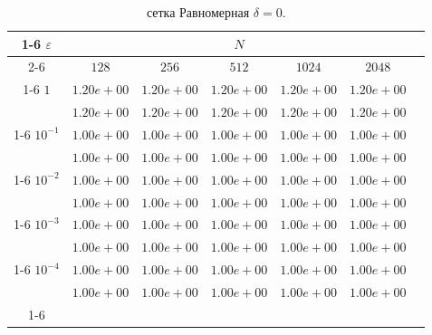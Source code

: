 \documentclass[10pt,twoside]{uz_kgu}
\begin{document}
\begin{table} [!htb]
    \caption {сетка Равномерная $\delta = 0.$}
        \begin{center}
\begin{tabular}{|c|c|c|c|c|c|c}
\cline{1-6} $\varepsilon$ & \multicolumn{5}{c|}{$N$} \\
\cline{2-6} &$128 $ & $256$ & $512$  & $1024$& $2048$\\
\cline{1-6}
$1$
&$1.20e+00$&$1.20e+00$&$1.20e+00$&$1.20e+00$& $1.20e+00$\\
&$1.20e+00$&$1.20e+00$&$1.20e+00$&$1.20e+00$& $1.20e+00$\\
\cline{1-6}
$10^{-1}$
&$1.00e+00$&$1.00e+00$&$1.00e+00$&$1.00e+00$&$1.00e+00$\\
&$1.00e+00$&$1.00e+00$&$1.00e+00$&$1.00e+00$&$1.00e+00$\\
\cline{1-6}
$10^{-2}$
&$1.00e+00$&$1.00e+00$&$1.00e+00$&$1.00e+00$&$1.00e+00$\\
&$1.00e+00$&$1.00e+00$&$1.00e+00$&$1.00e+00$&$1.00e+00$\\
\cline{1-6}
$10^{-3}$
&$1.00e+00$&$1.00e+00$&$1.00e+00$&$1.00e+00$&$1.00e+00$\\
&$1.00e+00$&$1.00e+00$&$1.00e+00$&$1.00e+00$&$1.00e+00$\\
\cline{1-6}
$10^{-4}$
&$1.00e+00$&$1.00e+00$&$1.00e+00$&$1.00e+00$&$1.00e+00$\\
&$1.00e+00$&$1.00e+00$&$1.00e+00$&$1.00e+00$&$1.00e+00$\\
\cline{1-6}
        \end{tabular}
    \end{center}
\end{table}
\end{document}
